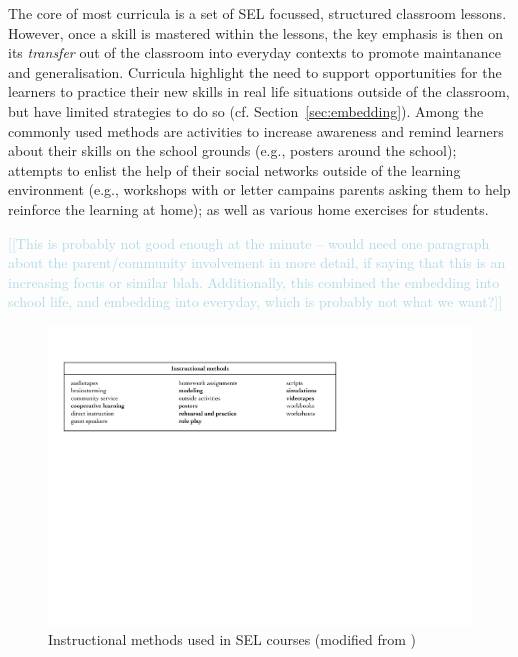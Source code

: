 \documentclass[prodmode,acmtochi]{acmsmall}
\newcommand{\todo}[1]{\textrm{\textrm{\textcolor{LightBlue}{[[#1]]} } } }
\begin{document}
The core of most curricula is a set of SEL focussed, structured classroom lessons. However, once a skill is mastered within the lessons, the key emphasis is then on its \emph{transfer} out of the classroom into everyday contexts to promote maintanance and generalisation. Curricula highlight the need to support opportunities for the learners to practice their new skills in real life situations outside of the classroom, but have limited strategies to do so (cf. Section~\ref{sec:embedding}). Among the commonly used methods are activities to increase awareness and remind learners about their skills on the school grounds (e.g., posters around the school); attempts to enlist the help of their social networks outside of the learning environment (e.g., workshops with or letter campains parents asking them to help reinforce the learning at home); as well as various home exercises for students.

\todo{This is probably not good enough at the minute -- would need one paragraph about the parent/community involvement in more detail, if saying that this is an increasing focus or similar blah. Additionally, this combined the embedding into school life, and embedding into everyday, which is probably not what we want?}

\begin{figure}
  \centering
	\includegraphics[width=.98\textwidth]{images/Elias-MethodsList}
	\caption{Instructional methods used in SEL courses (modified from \cite[p.109]{Elias1997})}
	\label{fig:methods}
\end{figure}
\end{document}
